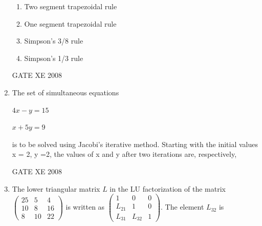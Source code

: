 \documentclass[12pt]{article}
\begin{document}
\begin{enumerate}[label=Q\arabic*.]
\begin{enumerate}[label=(\Alph*)]
\item Two segment trapezoidal rule
\item One segment trapezoidal rule
\item Simpson's 3/8 rule
\item Simpson's 1/3 rule
\end{enumerate}

GATE XE 2008
\item The set of simultaneous equations \begin{center}$4x-y=15$ 

$x+5y=9$\end{center} is to be solved using Jacobi's iterative method. Starting with the initial values x = 2, y =2, the values of x and y after two iterations are, respectively,

\begin{enumerate}[label=(\Alph*)]
\end{enumerate}

GATE XE 2008
\item The lower triangular matrix $L$ in the LU factorization of the matrix\newline
$\begin{pmatrix}
    25&5&4\\10&8&16\\8&10&22
\end{pmatrix}$ is written as $\begin{pmatrix}
    1&0&0\\L_{21}&1&0\\L_{31}&L_{32}&1
\end{pmatrix}$. The element $L_{32}$ is 

\begin{enumerate}[label=(\Alph*)]
\end{enumerate}


\end{enumerate}
\end{document}
